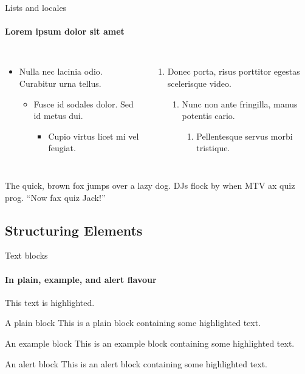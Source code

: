 \documentclass{beamer}
\begin{document}
\begin{frame}[label=lists]{Lists and locales}
  \framesubtitle{Lorem ipsum dolor sit amet}
  \begin{columns}[onlytextwidth]
    \begin{itemize}
      \item Nulla nec lacinia odio. Curabitur urna tellus.
            \begin{itemize}
              \item Fusce id sodales dolor. Sed id metus dui.
                    \begin{itemize}
                      \item Cupio virtus licet mi vel feugiat.
                    \end{itemize}
            \end{itemize}
    \end{itemize}
    \begin{enumerate}
      \item Donec porta, risus porttitor egestas scelerisque video.
            \begin{enumerate}
              \item Nunc non ante fringilla, manus potentis cario.
                    \begin{enumerate}
                      \item Pellentesque servus morbi tristique.
                    \end{enumerate}
            \end{enumerate}
    \end{enumerate}
  \end{columns}
  \bigskip
  \justifying


  {The quick, brown fox jumps over a lazy
    dog. DJs flock by when MTV ax quiz prog. “Now fax quiz Jack!”}
\end{frame}

\subsection{Structuring Elements}
\begin{frame}[label=simmonshall]{Text blocks}
  \framesubtitle{In plain, example, and \alert{alert} flavour}
  \alert{This text} is highlighted.

  \begin{block}{A plain block}
    This is a plain block containing some \alert{highlighted text}.
  \end{block}
  \begin{exampleblock}{An example block}
    This is an example block containing some \alert{highlighted text}.
  \end{exampleblock}
  \begin{alertblock}{An alert block}
    This is an alert block containing some \alert{highlighted text}.
  \end{alertblock}
\end{frame}
\end{document}
